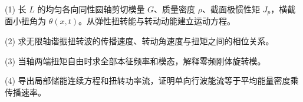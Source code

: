 (1) 长 \(L\) 的均匀各向同性圆轴剪切模量 \(G\)、质量密度 \(\rho\)、截面极惯性矩 \(J_p\)，横截面小扭角为 \(\theta(x,t)\)。从弹性扭转能与转动动能建立运动方程。

(2) 求无限轴谐振扭转波的传播速度、转动角速度与扭矩之间的相位关系。

(3) 当轴两端扭矩自由时求全部本征频率和模态，解释零频刚体旋转模。

(4) 导出局部储能连续方程和扭转功率流，证明单向行波能流等于平均能量密度乘传播速率。
